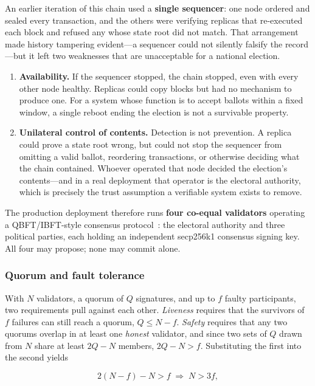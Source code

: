 An earlier iteration of this chain used a \textbf{single sequencer}: one node ordered and sealed every transaction, and the others were verifying replicas that re-executed each block and refused any whose state root did not match. That arrangement made history tampering evident---a sequencer could not silently falsify the record---but it left two weaknesses that are unacceptable for a national election.

\begin{enumerate}
    \item \textbf{Availability.} If the sequencer stopped, the chain stopped, even with every other node healthy. Replicas could copy blocks but had no mechanism to produce one. For a system whose function is to accept ballots within a fixed window, a single reboot ending the election is not a survivable property.
    \item \textbf{Unilateral control of contents.} Detection is not prevention. A replica could prove a state root wrong, but could not stop the sequencer from omitting a valid ballot, reordering transactions, or otherwise deciding what the chain contained. Whoever operated that node decided the election's contents---and in a real deployment that operator is the electoral authority, which is precisely the trust assumption a verifiable system exists to remove.
\end{enumerate}

The production deployment therefore runs \textbf{four co-equal validators} operating a QBFT/IBFT-style consensus protocol~\cite{castro1999practical}: the electoral authority and three political parties, each holding an independent secp256k1 consensus signing key. All four may propose; none may commit alone.

\subsubsection{Quorum and fault tolerance}

With $N$ validators, a quorum of $Q$ signatures, and up to $f$ faulty participants, two requirements pull against each other. \emph{Liveness} requires that the survivors of $f$ failures can still reach a quorum, $Q \leq N - f$. \emph{Safety} requires that any two quorums overlap in at least one \emph{honest} validator, and since two sets of $Q$ drawn from $N$ share at least $2Q - N$ members, $2Q - N > f$. Substituting the first into the second yields

\begin{equation}
2(N - f) - N > f \;\Longrightarrow\; N > 3f,
\end{equation}

